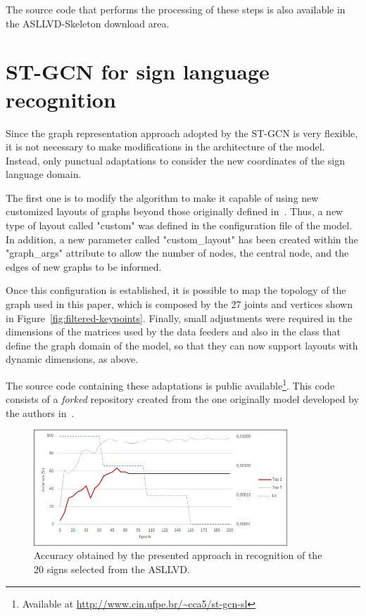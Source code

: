 The source code that performs the processing of these steps is also available in the ASLLVD-Skeleton download area.


\section{ST-GCN for sign language recognition} 
\label{sec:st-gcn-for-sl-recognition}

Since the graph representation approach adopted by the ST-GCN is very flexible, it is not necessary to make modifications in the architecture of the model. Instead, only punctual adaptations to consider the new coordinates of the sign language domain.

The first one is to modify the algorithm to make it capable of using new customized layouts of graphs beyond those originally defined in~\cite{st-gcn-2018}. Thus, a new type of layout called "custom" was defined in the configuration file of the model. In addition, a new parameter called "custom\_layout" has been created within the "graph\_args" attribute to allow the number of nodes, the central node, and the edges of new graphs to be informed.

Once this configuration is established, it is possible to map the topology of the graph used in this paper, which is composed by the 27 joints and vertices shown in  Figure~\ref{fig:filtered-keypoints}. Finally, small adjustments were required in the dimensions of the matrices used by the data feeders and also in the class that define the graph domain of the model, so that they can now support layouts with dynamic dimensions, as above.

The source code containing these adaptations is public available\footnote{
    Available at \url{http://www.cin.ufpe.br/~cca5/st-gcn-sl}
}. This code consists of a \textit{forked} repository created from the one originally model developed by the authors in~\cite{st-gcn-2018}.


\begin{figure}[!t]
    \centering
    \includegraphics[width=0.85\textwidth]{images/results_20}
    \caption{Accuracy obtained by the presented approach in recognition of the 20 signs selected from the ASLLVD.}
    \label{fig:training-asllvd-20}
\end{figure}


